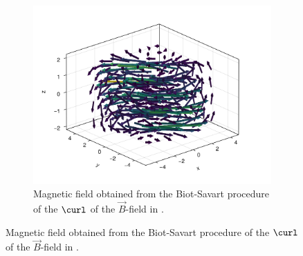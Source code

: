 \documentclass[10pt]{article}
\begin{document}
  \begin{figure}[H]
    \begin{subfigure}[t]{0.48\textwidth}
      \centering
      \includegraphics[width=\textwidth]{../figures/cdpbr-b-field.pdf}
      \caption{Magnetic field obtained from the Biot-Savart procedure of the $\curl$ of the $\vec{B}$-field in .}
      \label{fig:cdpbr-b-field}
    \end{subfigure}
  \end{figure}
\end{document}
